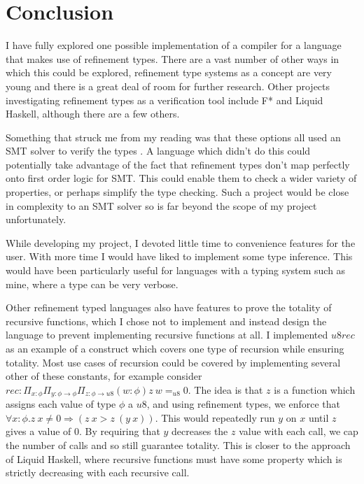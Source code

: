 \section{Conclusion}

I have fully explored one possible implementation of a compiler for a language that makes use of
refinement types.
There are a vast number of other ways in which this could be explored,
refinement type systems as a concept are very young and there is a great deal of room for further
research.
Other projects investigating refinement types as a verification tool include F* and Liquid Haskell,
although there are a few others.

Something that struck me from my reading was that these options all used an SMT solver to verify
the types \cite{vazouSJ14}.
A language which didn't do this could potentially take advantage of the fact that refinement types
don't map perfectly onto first order logic for SMT.
This could enable them to check a wider variety of properties, or perhaps simplify the type checking.
Such a project would be close in complexity to an SMT solver so is far beyond the scope of my
project unfortunately.

While developing my project, I devoted little time to convenience features for the user.
With more time I would have liked to implement some type inference.
This would have been particularly useful for languages with a typing system such as mine,
where a type can be very verbose.

Other refinement typed languages also have features to prove the totality of recursive functions,
which I chose not to implement and instead design the language to prevent implementing recursive
functions at all.
I implemented $u8rec$ as an example of a construct which covers one type of recursion while
ensuring totality.
Most use cases of recursion could be covered by implementing several other of these constants,
for example consider
$rec: \Pi_{x: \phi} \Pi_{y: \phi \rightarrow \phi} \Pi_{z: \phi \rightarrow u8} (w: \phi)z\ w =_{u8} 0$.
The idea is that $z$ is a function which assigns each value of type $\phi$ a $u8$, and using
refinement types, we enforce that $\forall x: \phi . z\ x \neq 0 \Rightarrow (z\ x > z\ (y\ x))$.
This would repeatedly run $y$ on $x$ until $z$ gives a value of 0.
By requiring that $y$ decreases the $z$ value with each call, we cap the number of calls and so
still guarantee totality.
This is closer to the approach of Liquid Haskell, where recursive functions must have some property
which is strictly decreasing with each recursive call.

